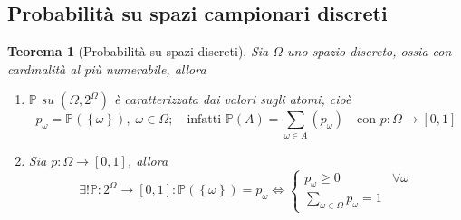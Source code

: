 \documentclass[a4paper,12pt]{article}
\theoremstyle{break}
\newtheorem{theorem}{Teorema}[section]
\numberwithin{equation}{section}
\begin{document}
\subsection{Probabilità su spazi campionari discreti}
\begin{theorem}[Probabilità su spazi discreti]
  Sia \(\Omega\) uno spazio discreto, ossia con cardinalità al più numerabile, allora
  \begin{enumerate}
    \item \(\mathbb{P}\) su \((\Omega, 2^{\Omega})\) è caratterizzata dai valori sugli atomi, cioè
    \[
      p_{\omega} = \mathbb{P}(\left\lbrace \omega \right\rbrace), \; \omega \in \Omega; \quad \mbox{infatti }\mathbb{P}(A) = \sum_{\omega \in A} (p_{\omega}) \quad \mbox{con }p : \Omega \to [0,1]
    \]
    \item Sia \(p:\Omega \to [0,1]\), allora
    \[
      \exists ! \mathbb{P} : 2^{\Omega} \to [0,1] : \mathbb{P}(\left\lbrace \omega \right\rbrace) = p_{\omega} \Longleftrightarrow \begin{cases}
        p_{\omega} \geq 0 & \forall \omega \\
        \sum_{\omega \in \Omega} p_{\omega} = 1
      \end{cases}
    \]
  \end{enumerate}
\end{theorem}
\end{document}
